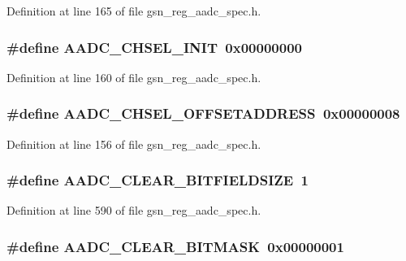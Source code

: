 Definition at line 165 of file gsn\_\-reg\_\-aadc\_\-spec.h.

\hypertarget{a00543_a6ec0c6f8491b61a2dc511f953e94cf84}{
\subsubsection[{AADC\_\-CHSEL\_\-INIT}]{\setlength{\rightskip}{0pt plus 5cm}\#define AADC\_\-CHSEL\_\-INIT~0x00000000}}
\label{a00543_a6ec0c6f8491b61a2dc511f953e94cf84}


Definition at line 160 of file gsn\_\-reg\_\-aadc\_\-spec.h.

\hypertarget{a00543_ae1c6195f828391a79a7e096959bed63e}{
\subsubsection[{AADC\_\-CHSEL\_\-OFFSETADDRESS}]{\setlength{\rightskip}{0pt plus 5cm}\#define AADC\_\-CHSEL\_\-OFFSETADDRESS~0x00000008}}
\label{a00543_ae1c6195f828391a79a7e096959bed63e}


Definition at line 156 of file gsn\_\-reg\_\-aadc\_\-spec.h.

\hypertarget{a00543_a292dad54c77769c60bff2a1450302d66}{
\subsubsection[{AADC\_\-CLEAR\_\-BITFIELDSIZE}]{\setlength{\rightskip}{0pt plus 5cm}\#define AADC\_\-CLEAR\_\-BITFIELDSIZE~1}}
\label{a00543_a292dad54c77769c60bff2a1450302d66}


Definition at line 590 of file gsn\_\-reg\_\-aadc\_\-spec.h.

\hypertarget{a00543_a7cf3d6085eed426db92284a9ce9428e0}{
\subsubsection[{AADC\_\-CLEAR\_\-BITMASK}]{\setlength{\rightskip}{0pt plus 5cm}\#define AADC\_\-CLEAR\_\-BITMASK~0x00000001}}
\label{a00543_a7cf3d6085eed426db92284a9ce9428e0}


